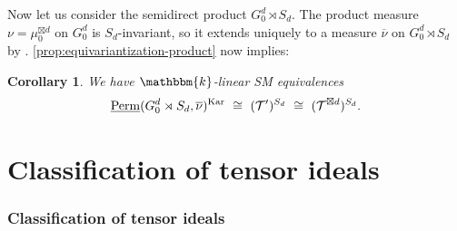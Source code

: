 \documentclass[11pt,a4paper]{amsart}
\theoremstyle{plain}%
\newtheorem{corollary}[lemma]{Corollary}
\theoremstyle{definition}
\theoremstyle{remark}
\newcommand{\Perm}{\underline{{\rm Perm}}}
\newcommand{\kk}{\mathbbm{k}}
\newcommand{\Kar}{\mathrm{Kar}}
\begin{document}
Now let us consider the semidirect product $G_0^d\rtimes S_d$.
The product measure $\nu=\mu_0^{\boxtimes d}$ on $G_0^d$ is $S_d$-invariant, so it extends uniquely to a measure $\overline{\nu}$ on $G_0^d\rtimes S_d$ by \cite[\S3.4(e)]{HS-oligomorphic}.
\cref{prop:equivariantization-product} now implies:
\begin{corollary}
      We have $\kk$-linear SM equivalences
\[
\Perm(G_0^d\rtimes S_d,\overline{\nu})^{\Kar}~\cong~(\mathcal T')^{S_d} ~\cong~ (\mathcal T^{\boxtimes d})^{S_d}.
\]
  
\end{corollary}

\part{Classification of tensor ideals}






 \section{Classification of tensor ideals}
\end{document}
